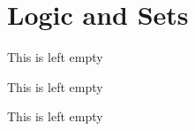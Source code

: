 \chapter{Logic and Sets}

\begin{example}
    This is left empty
\end{example}

\begin{definition}
    This is left empty
\end{definition}

\begin{remark}
    This is left empty
\end{remark}






